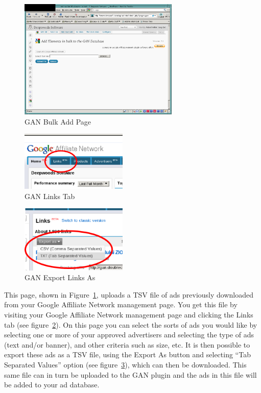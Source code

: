\documentclass[letterpaper]{article}
\begin{document}
\begin{figure}[ht]
\begin{centering}
\includegraphics[width=3in]{bulkadd.png}
\caption{GAN Bulk Add Page}
\label{fig:bulkadd}
\end{centering}
\end{figure}
\begin{figure}[ht]
\begin{centering}
\includegraphics[width=2in]{ganLinksTab.png}
\caption{GAN Links Tab}
\label{fig:ganLinksTab}
\end{centering}
\end{figure}
\begin{figure}[ht]
\begin{centering}
\includegraphics[width=2in]{ganExport.png}
\caption{GAN Export Links As}
\label{fig:ganExport}
\end{centering}
\end{figure}
This page, shown in Figure~\ref{fig:bulkadd}, uploads a TSV file of ads
previously downloaded from your Google Affiliate Network management
page. You get this file by visiting your Google Affiliate Network
management page and clicking the Links tab (see
figure~\ref{fig:ganLinksTab}). On this page you can select the sorts of
ads you would like by selecting one or more of your approved
advertisers and selecting the type of ads (text and/or banner), and
other criteria such as size, etc. It is then possible to export these
ads as a TSV file, using the Export As button and selecting ``Tab
Separated Values'' option (see figure~\ref{fig:ganExport}), which can
then be downloaded. This same file can in turn be uploaded to the GAN
plugin and the ads in this file will be added to your ad database.
\end{document}
